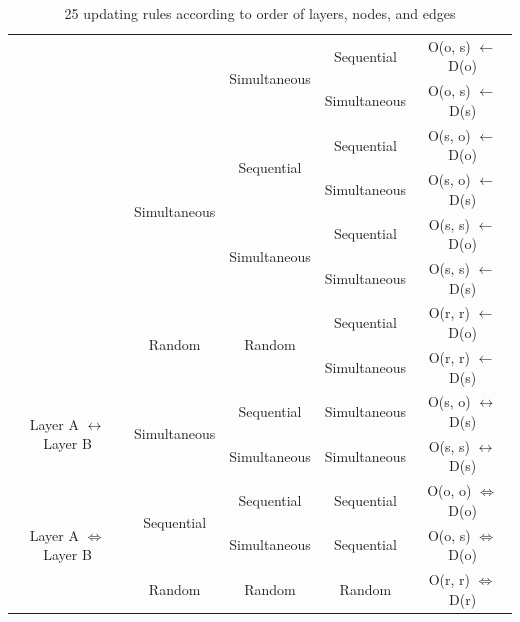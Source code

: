 \begin{table}[htp]
\begin{center}
\begin{tabular}{c|c|c|c|c}
			&                                & \multirow{2}{*}{Simultaneous}      & Sequential             & O(o, s) $\leftarrow$ D(o) \\  \cline{4-5} 
			&                                &                                    & Simultaneous           & O(o, s) $\leftarrow$ D(s) \\  \cline{2-5} 
			& \multirow{4}{*}{Simultaneous}  & \multirow{2}{*}{Sequential}        & Sequential             & O(s, o) $\leftarrow$ D(o) \\  \cline{4-5}
			&                                &                                    & Simultaneous           & O(s, o) $\leftarrow$ D(s) \\  \cline{3-5}
			&                                & \multirow{2}{*}{Simultaneous}      & Sequential             & O(s, s) $\leftarrow$ D(o) \\  \cline{4-5}
			&                                &                                    & Simultaneous           & O(s, s) $\leftarrow$ D(s) \\  \cline{2-5}
			& \multirow{2}{*}{Random}        & \multirow{2}{*}{Random}            & Sequential             & O(r, r) $\leftarrow$ D(o) \\  \cline{4-5}
			&                                &                                    & Simultaneous           & O(r, r) $\leftarrow$ D(s) \\   \hline
			\multirow{2}{*}{Layer A $\leftrightarrow$ Layer B}& \multirow{2}{*}{Simultaneous}& Sequential                         & Simultaneous           & O(s, o) $\leftrightarrow$ D(s) \\ \cline{3-5}
			&                                & Simultaneous                       & Simultaneous           & O(s, s) $\leftrightarrow$ D(s) \\ \hline
			\multirow{3}{*}{Layer A $\Leftrightarrow$ Layer B}& \multirow{2}{*}{Sequential}  & Sequential                         & Sequential             & O(o, o) $\Leftrightarrow$ D(o) \\ \cline{3-5}
			&                                & Simultaneous                       & Sequential             & O(o, s) $\Leftrightarrow$ D(o) \\ \cline{2-5}
			& Random                         & Random                             & Random                 & O(r, r) $\Leftrightarrow$ D(r) \\ \hline
			
		\end{tabular}
	\end{center}
	\caption{25 updating rules according to order of layers, nodes, and edges}
	\label{25updating_rules}
\end{table}

